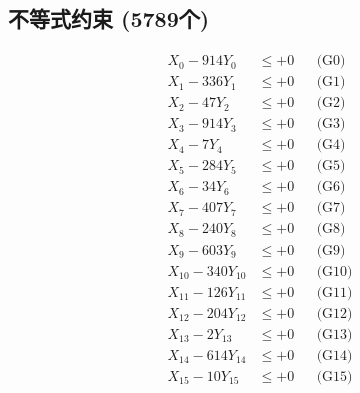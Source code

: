 \documentclass[a4paper,10pt]{article}
\begin{document}
\subsection{不等式约束 (5789个)}

\allowdisplaybreaks
{\small
\begin{align}
\allowbreak
\allowbreak
\allowbreak
\allowbreak
\allowbreak
\allowbreak
\allowbreak
\allowbreak
\allowbreak
\allowbreak
\allowbreak
\allowbreak
\allowbreak
\allowbreak
\allowbreak
\allowbreak
\allowbreak
\allowbreak
\allowbreak
\allowbreak
\allowbreak
\allowbreak
\allowbreak
\allowbreak
\allowbreak
\allowbreak
\allowbreak
\allowbreak
\allowbreak
\allowbreak
\allowbreak
\allowbreak
\allowbreak
\allowbreak
\allowbreak
\allowbreak
\allowbreak
\allowbreak
\allowbreak
\allowbreak
\allowbreak
\allowbreak
\allowbreak
\allowbreak
\allowbreak
\allowbreak
\allowbreak
\allowbreak
\allowbreak
\allowbreak
\allowbreak
\allowbreak
\allowbreak
\allowbreak
\allowbreak
\allowbreak
\allowbreak
\allowbreak
\allowbreak
\allowbreak
\allowbreak
\allowbreak
\allowbreak
\allowbreak
\allowbreak
\allowbreak
\allowbreak
\allowbreak
\allowbreak
\allowbreak
\allowbreak
\allowbreak
\allowbreak
\allowbreak
\allowbreak
\allowbreak
\allowbreak
\allowbreak
X_{0} - 914Y_{0} &\leq +0 && \text{(G0)} \\
\allowbreak
X_{1} - 336Y_{1} &\leq +0 && \text{(G1)} \\
X_{2} - 47Y_{2} &\leq +0 && \text{(G2)} \\
X_{3} - 914Y_{3} &\leq +0 && \text{(G3)} \\
X_{4} - 7Y_{4} &\leq +0 && \text{(G4)} \\
X_{5} - 284Y_{5} &\leq +0 && \text{(G5)} \\
X_{6} - 34Y_{6} &\leq +0 && \text{(G6)} \\
X_{7} - 407Y_{7} &\leq +0 && \text{(G7)} \\
X_{8} - 240Y_{8} &\leq +0 && \text{(G8)} \\
X_{9} - 603Y_{9} &\leq +0 && \text{(G9)} \\
X_{10} - 340Y_{10} &\leq +0 && \text{(G10)} \\
\allowbreak
X_{11} - 126Y_{11} &\leq +0 && \text{(G11)} \\
X_{12} - 204Y_{12} &\leq +0 && \text{(G12)} \\
X_{13} - 2Y_{13} &\leq +0 && \text{(G13)} \\
X_{14} - 614Y_{14} &\leq +0 && \text{(G14)} \\
X_{15} - 10Y_{15} &\leq +0 && \text{(G15)} \\

\end{align}}
\end{document}
